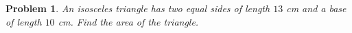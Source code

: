 \documentclass{article}
\newtheorem{problem}{Problem}
\begin{document}
\begin{problem}
An isosceles triangle has two equal sides of length $13$ cm and a base of
length $10$ cm. Find the area of the triangle.
\end{problem}
\end{document}
